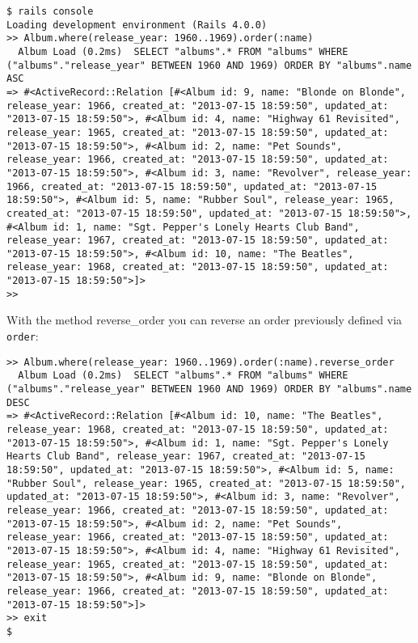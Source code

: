 \documentclass[a4paper]{book}
\begin{document}
\begin{shaded}\begin{verbatim}
$ rails console
Loading development environment (Rails 4.0.0)
>> Album.where(release_year: 1960..1969).order(:name)
  Album Load (0.2ms)  SELECT "albums".* FROM "albums" WHERE ("albums"."release_year" BETWEEN 1960 AND 1969) ORDER BY "albums".name ASC
=> #<ActiveRecord::Relation [#<Album id: 9, name: "Blonde on Blonde", release_year: 1966, created_at: "2013-07-15 18:59:50", updated_at: "2013-07-15 18:59:50">, #<Album id: 4, name: "Highway 61 Revisited", release_year: 1965, created_at: "2013-07-15 18:59:50", updated_at: "2013-07-15 18:59:50">, #<Album id: 2, name: "Pet Sounds", release_year: 1966, created_at: "2013-07-15 18:59:50", updated_at: "2013-07-15 18:59:50">, #<Album id: 3, name: "Revolver", release_year: 1966, created_at: "2013-07-15 18:59:50", updated_at: "2013-07-15 18:59:50">, #<Album id: 5, name: "Rubber Soul", release_year: 1965, created_at: "2013-07-15 18:59:50", updated_at: "2013-07-15 18:59:50">, #<Album id: 1, name: "Sgt. Pepper's Lonely Hearts Club Band", release_year: 1967, created_at: "2013-07-15 18:59:50", updated_at: "2013-07-15 18:59:50">, #<Album id: 10, name: "The Beatles", release_year: 1968, created_at: "2013-07-15 18:59:50", updated_at: "2013-07-15 18:59:50">]>
>>
\end{verbatim}\end{shaded}

With the method reverse\_order you can reverse an order previously defined via \texttt{order}:

\begin{shaded}\begin{verbatim}
>> Album.where(release_year: 1960..1969).order(:name).reverse_order
  Album Load (0.2ms)  SELECT "albums".* FROM "albums" WHERE ("albums"."release_year" BETWEEN 1960 AND 1969) ORDER BY "albums".name DESC
=> #<ActiveRecord::Relation [#<Album id: 10, name: "The Beatles", release_year: 1968, created_at: "2013-07-15 18:59:50", updated_at: "2013-07-15 18:59:50">, #<Album id: 1, name: "Sgt. Pepper's Lonely Hearts Club Band", release_year: 1967, created_at: "2013-07-15 18:59:50", updated_at: "2013-07-15 18:59:50">, #<Album id: 5, name: "Rubber Soul", release_year: 1965, created_at: "2013-07-15 18:59:50", updated_at: "2013-07-15 18:59:50">, #<Album id: 3, name: "Revolver", release_year: 1966, created_at: "2013-07-15 18:59:50", updated_at: "2013-07-15 18:59:50">, #<Album id: 2, name: "Pet Sounds", release_year: 1966, created_at: "2013-07-15 18:59:50", updated_at: "2013-07-15 18:59:50">, #<Album id: 4, name: "Highway 61 Revisited", release_year: 1965, created_at: "2013-07-15 18:59:50", updated_at: "2013-07-15 18:59:50">, #<Album id: 9, name: "Blonde on Blonde", release_year: 1966, created_at: "2013-07-15 18:59:50", updated_at: "2013-07-15 18:59:50">]>
>> exit
$
\end{verbatim}\end{shaded}
\end{document}
